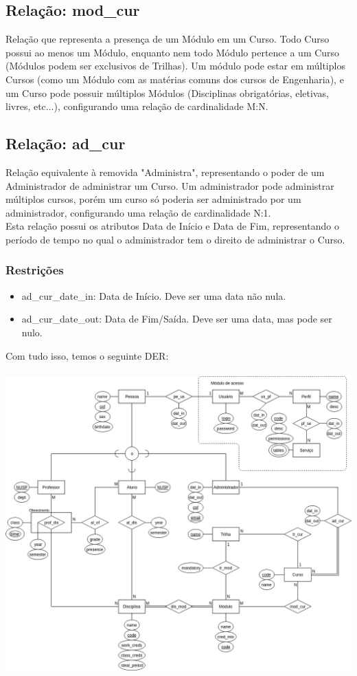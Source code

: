 \documentclass{article}
\begin{document}
  	\subsection{Relação: mod\_cur}
  	    \quad Relação que representa a presença de um Módulo em um Curso. Todo Curso possui ao menos um Módulo, enquanto nem todo Módulo pertence a um Curso (Módulos podem ser exclusivos de Trilhas).
  	    \null \quad Um módulo pode estar em múltiplos Cursos (como um Módulo com as matérias comuns dos cursos de Engenharia), e um Curso pode possuir múltiplos Módulos (Disciplinas obrigatórias, eletivas, livres, etc...), configurando uma relação de cardinalidade M:N.
  	
    \subsection{Relação: ad\_cur}
        \quad Relação equivalente à removida "Administra", representando o poder de um Administrador de administrar um Curso. Um administrador pode administrar múltiplos cursos, porém um curso só poderia ser administrado por um administrador, configurando uma relação de cardinalidade N:1. \\
        \null \quad Esta relação possui os atributos Data de Início e Data de Fim, representando o período de tempo no qual o administrador tem o direito de administrar o Curso.
        \subsubsection{Restrições}
  	        \begin{itemize}
  	            \item ad\_cur\_date\_in: Data de Início. Deve ser uma data não nula.
  	            \item ad\_cur\_date\_out: Data de Fim/Saída. Deve ser uma data, mas pode ser nulo.
  		    \end{itemize}
 
    \pagebreak
  	Com tudo isso, temos o seguinte DER: \\ \\
    \includegraphics[width=\textwidth]{MER.png}
    
\end{document}
